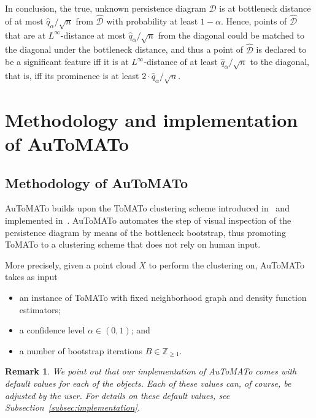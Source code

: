 \documentclass[10pt]{article} %
\theoremstyle{plain}
\newtheorem{remark}[theorem]{Remark}
\newcommand{\ZZ}{\mathbb{Z}}
\newcommand{\DD}{\mathcal{D}}
\newcommand{\aut}{AuToMATo\xspace}
\newcommand{\tom}{ToMATo\xspace}
\begin{document}
In conclusion, the true, unknown persistence diagram \(\DD\) is at bottleneck distance of at most \(\widehat{q}_{\alpha}/\sqrt{n}\) from \(\widehat{\DD}\) with probability at least \(1-\alpha\). Hence, points of \(\widehat{\DD}\) that are at \(L^{\infty}\)-distance at most \(\widehat{q}_{\alpha}/\sqrt{n}\) from the diagonal could be matched to the diagonal under the bottleneck distance, and thus a point of \(\widehat{\DD}\) is declared to be a significant feature iff it is at \(L^{\infty}\)-distance of at least \(\widehat{q}_{\alpha}/\sqrt{n}\) to the diagonal, that is, iff its prominence is at least \(2\cdot\widehat{q}_{\alpha}/\sqrt{n}\).


\section{Methodology and implementation of \aut}\label{sec:methodology_and_implementation}

\subsection{Methodology of \aut}\label{subsec:methodology}

\aut builds upon the \tom clustering scheme introduced in~\citet{chazal2013persistence} and implemented in~\citet{gudhi:PersistenceBasedClustering}.
\aut automates the step of visual inspection of the persistence diagram by means of the bottleneck bootstrap, thus promoting \tom to a clustering scheme that does not rely on human input.

More precisely, given a point cloud \(X\) to perform the clustering on, \aut takes as input

\begin{itemize}[nolistsep]
    \item an instance of \tom with fixed neighborhood graph and density function estimators;
    \item a confidence level \(\alpha\in(0,1)\); and
    \item a number of bootstrap iterations \(B\in\ZZ_{\geq 1}\).
\end{itemize}

\begin{remark}\label{rem:default_values}
    We point out that our implementation of \aut comes with default values for each of the objects.
    Each of these values can, of course, be adjusted by the user. For details on these default values, see Subsection~\ref{subsec:implementation}.
\end{remark}
\end{document}
